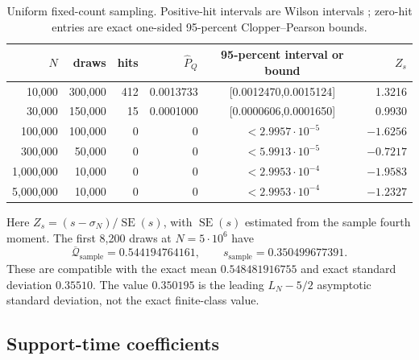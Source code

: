\documentclass[11pt,reqno]{amsart}
\numberwithin{equation}{section}
\theoremstyle{plain}
\theoremstyle{definition}
\theoremstyle{remark}
\newcommand{\QF}{\mathcal Q}
\begin{document}
\begin{table}[htbp]
\centering
\scriptsize
\caption{Uniform fixed-count sampling.  Positive-hit intervals are Wilson
intervals \cite{Wilson1927}; zero-hit entries are exact one-sided 95-percent
Clopper--Pearson bounds.}
\label{tab:monte-carlo-ladder}
\begin{tabular}{r r r r c r}
\toprule
\(N\)&draws&hits&\(\widehat P_Q\)&95-percent interval or bound&\(Z_s\)\\
\midrule
10,000&300,000&412&0.0013733&[0.0012470,0.0015124]&1.3216\\
30,000&150,000&15&0.0001000&[0.0000606,0.0001650]&0.9930\\
100,000&100,000&0&0&\(<2.9957\cdot10^{-5}\)&\(-1.6256\)\\
300,000&50,000&0&0&\(<5.9913\cdot10^{-5}\)&\(-0.7217\)\\
1,000,000&10,000&0&0&\(<2.9953\cdot10^{-4}\)&\(-1.9583\)\\
5,000,000&10,000&0&0&\(<2.9953\cdot10^{-4}\)&\(-1.2327\)\\
\bottomrule
\end{tabular}
\end{table}

Here \(Z_s=(s-\sigma_N)/\operatorname{SE}(s)\), with
\(\operatorname{SE}(s)\) estimated from the sample fourth moment.  The first
8,200 draws at \(N=5\cdot10^6\) have
\begin{equation}
\overline{\QF}_{\mathrm{sample}}=0.544194764161,\qquad
s_{\mathrm{sample}}=0.350499677391.
\label{eq:sample-mean-standard-deviation}
\end{equation}
These are compatible with the exact mean \(0.548481916755\) and exact
standard deviation \(0.35510\).  The value \(0.350195\) is the leading
\(L_N-5/2\) asymptotic standard deviation, not the exact finite-class value.

\subsection{Support-time coefficients}
\label{subsec:numerical-support-coefficients}
\end{document}
